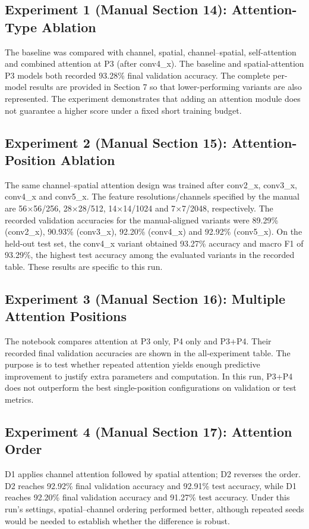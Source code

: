 \documentclass[10pt]{article}
\begin{document}
\subsection*{Experiment 1 (Manual Section 14): Attention-Type Ablation}
The baseline was compared with channel, spatial, channel--spatial, self-attention and combined attention at P3 (after conv4\_x). The baseline and spatial-attention P3 models both recorded 93.28\% final validation accuracy. The complete per-model results are provided in Section 7 so that lower-performing variants are also represented. The experiment demonstrates that adding an attention module does not guarantee a higher score under a fixed short training budget.

\subsection*{Experiment 2 (Manual Section 15): Attention-Position Ablation}
The same channel--spatial attention design was trained after conv2\_x, conv3\_x, conv4\_x and conv5\_x. The feature resolutions/channels specified by the manual are 56$\times$56/256, 28$\times$28/512, 14$\times$14/1024 and 7$\times$7/2048, respectively. The recorded validation accuracies for the manual-aligned variants were 89.29\% (conv2\_x), 90.93\% (conv3\_x), 92.20\% (conv4\_x) and 92.92\% (conv5\_x). On the held-out test set, the conv4\_x variant obtained 93.27\% accuracy and macro F1 of 93.29\%, the highest test accuracy among the evaluated variants in the recorded table. These results are specific to this run.

\subsection*{Experiment 3 (Manual Section 16): Multiple Attention Positions}
The notebook compares attention at P3 only, P4 only and P3+P4. Their recorded final validation accuracies are shown in the all-experiment table. The purpose is to test whether repeated attention yields enough predictive improvement to justify extra parameters and computation. In this run, P3+P4 does not outperform the best single-position configurations on validation or test metrics.

\subsection*{Experiment 4 (Manual Section 17): Attention Order}
D1 applies channel attention followed by spatial attention; D2 reverses the order. D2 reaches 92.92\% final validation accuracy and 92.91\% test accuracy, while D1 reaches 92.20\% final validation accuracy and 91.27\% test accuracy. Under this run's settings, spatial--channel ordering performed better, although repeated seeds would be needed to establish whether the difference is robust.
\end{document}
